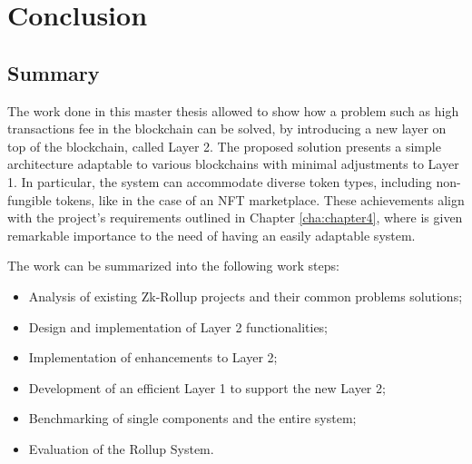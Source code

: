 \chapter{Conclusion\label{cha:chapter8}}

\section{Summary\label{sec:summary}}

The work done in this master thesis allowed to show how a problem such as high transactions fee in the blockchain can be solved, by introducing a new layer on top of the blockchain, called Layer 2. The proposed solution presents a simple architecture adaptable to various blockchains with minimal adjustments to Layer 1. In particular, the system can accommodate diverse token types, including non-fungible tokens, like in the case of an NFT marketplace. These achievements align with the project's requirements outlined in Chapter \ref{cha:chapter4}, where is given remarkable importance to the need of having an easily adaptable system.

\noindent The work can be summarized into the following work steps:
\vspace{-0.11in}
\begin{itemize}
	\item Analysis of existing Zk-Rollup projects and their common problems solutions;
	      \vspace{-0.11in}
	\item Design and implementation of Layer 2 functionalities;
	      \vspace{-0.11in}
	\item Implementation of enhancements to Layer 2;
	      \vspace{-0.11in}
	\item Development of an efficient Layer 1 to support the new Layer 2;
	      \vspace{-0.11in}
	\item Benchmarking of single components and the entire system;
	      \vspace{-0.11in}
	\item Evaluation of the Rollup System.
\end{itemize}

